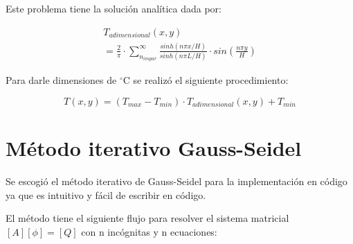 \documentclass[article,latterpaper]{IEEEtran}
\begin{document}
Este problema tiene la solución analítica dada por:

\begin{multline}
    T_{adimensional}(x,y)\\
    =\frac{2}{\pi}\cdot\sum_{n_{impar}}^\infty\frac{sinh(n\pi x/H)}{sinh(n\pi L/H)}\cdot sin(\frac{n\pi y}{H})
    \label{Sol_An_Ad}
\end{multline}

Para darle dimensiones de $^{\circ}\mathrm{C}$ se realizó el siguiente procedimiento:

\begin{equation}
    T(x,y)=(T_{max}-T_{min})\cdot T_{adimensional}(x,y) + T_{min}
    \label{Sol_An}
\end{equation}

\section{Método iterativo Gauss-Seidel}

Se escogió el método iterativo de Gauss-Seidel para la implementación en código ya que es intuitivo y fácil de escribir en código.

El método tiene el siguiente flujo para resolver el sistema matricial $[A][\phi]=[Q]$ con n incógnitas y n ecuaciones:
\end{document}
